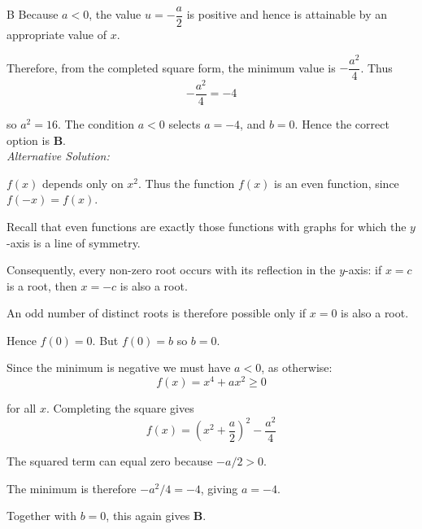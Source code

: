 \documentclass[11pt,a4paper]{article}
\begin{document}
\begin{enumerate}[label=\textbf{\arabic*.},leftmargin=*,itemsep=0pt,start=18]
\begin{djsSolution}{B}
Because $a<0$, the value $u=-\dfrac a2$ is positive and hence is attainable by an appropriate value of $x$.

Therefore, from the completed square form, the minimum value is $-\dfrac{a^2}{4}$. Thus
\[
-\frac{a^2}{4}=-4
\]

so $a^2=16$. The condition $a<0$ selects $a=-4$, and $b=0$. Hence the correct option is \textbf{B}. \\

\textit{Alternative Solution:}

$f(x)$ depends only on $x^2$. Thus the function $f(x)$ is an even function, since $f(-x)=f(x)$. 

Recall that even functions are exactly those functions with graphs for which the $y$-axis is a line of symmetry.

Consequently, every non-zero root occurs with its reflection in the $y$-axis: if $x=c$ is a root, then $x=-c$ is also a root. 

An odd number of distinct roots is therefore possible only if $x=0$ is also a root. 

Hence $f(0)=0$. But $f(0)=b$ so $b=0$.

Since the minimum is negative we must have $a<0$, as otherwise:
\[
f(x) = x^4+ax^2\geq0
\]

for all $x$. Completing the square gives
\[
f(x)=\left(x^2+\frac a2\right)^2-\frac{a^2}{4}
\]

The squared term can equal zero because $-a/2>0$. 

The minimum is therefore $-a^2/4=-4$, giving $a=-4$. 

Together with $b=0$, this again gives \textbf{B}.
\end{djsSolution}
\end{enumerate}
\clearpage
\thispagestyle{djssolutions}
\vspace*{8pt}
\end{document}
